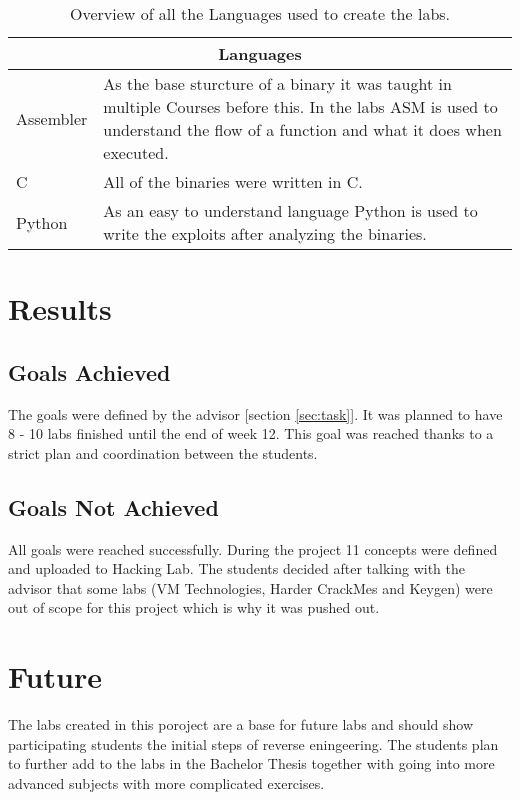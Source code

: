 \begin{center}
    \begin{table}[H]
        \centering
        \begin{tabular}{ |p{4.1cm}|p{10cm}| } 
            \hline
            \multicolumn{2}{||c||}{\textbf{Languages}} \\
            \hline
            \hline
                Assembler & As the base sturcture of a binary it was taught in multiple Courses before this. In the labs ASM is used to understand the flow of a function and what it does when executed. \\
            \hline
                C & All of the binaries were written in C.   \\
            \hline
                Python & As an easy to understand language Python is used to write the exploits after analyzing the binaries. \\
            \hline
        \end{tabular}
        \caption{Overview of all the Languages used to create the labs.}
        \label{tab:languages}
    \end{table}
\end{center}

\section{Results}
\subsection{Goals Achieved}
The goals were defined by the advisor [section \ref{sec:task}]. It was planned to have 8 - 10 labs finished until the end of week 12. This goal was reached thanks to a strict plan and coordination between the students.

\subsection{Goals Not Achieved}
All goals were reached successfully. During the project 11 concepts were defined and uploaded to Hacking Lab. The students decided after talking with the advisor that some labs (VM Technologies, Harder CrackMes and Keygen) were out of scope for this project which is why it was pushed out. 

\section{Future}
The labs created in this poroject are a base for future labs and should show participating students the initial steps of reverse eningeering. The students plan to further add to the labs in the Bachelor Thesis together with going into more advanced subjects with more complicated exercises. 
